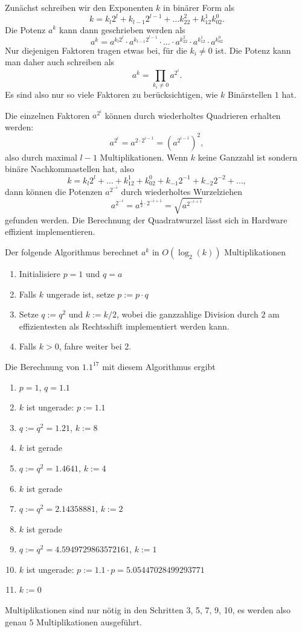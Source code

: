 Zunächst schreiben wir den Exponenten $k$ in binärer Form als
\[
k = k_l2^l + k_{l-1}2^{l-1} + \dots k_22^2+k_12^1 k_02^0.
\]
Die Potenz $a^k$ kann dann geschrieben werden als
\[
a^k
=
a^{k_l2^l} \cdot a^{k_{l-1}2^{l-1}} \cdot \dots \cdot
a^{k_22^2} \cdot a^{k_12^1} \cdot a^{k_02^0}
\]
Nur diejenigen Faktoren tragen etwas bei, für die $k_i\ne 0$ ist.
Die Potenz kann man daher auch schreiben als
\[
a^k
=
\prod_{k_i\ne 0} a^{2^i}.
\]
Es sind also nur so viele Faktoren zu berücksichtigen, wie $k$ 
Binärstellen $1$ hat.

Die einzelnen Faktoren $a^{2^i}$ können durch wiederholtes Quadrieren
erhalten werden:
\[
a^{2^i} = a^{2\cdot 2^{i-1}} = (a^{2^{i-1}})^2,
\]
also durch maximal $l-1$ Multiplikationen.
Wenn $k$ keine Ganzzahl ist sondern binäre Nachkommastellen hat, also
\[
k=k_l2^l + \dots + k_12^1 + k_02^0 + k_{-1}2^{-1} + k_{-2}2^{-2}+\dots,
\]
dann können die Potenzen $a^{2^{-i}}$ durch wiederholtes Wurzelziehen
\[
a^{2^{-i}} = a^{\frac12\cdot 2^{-i+1}} = \sqrt{a^{2^{-i+1}}}
\]
gefunden werden.
Die Berechnung der Quadratwurzel lässt sich in Hardware effizient
implementieren.

\begin{algorithmus}
\label{buch:crypto:teile-und-hersche}
Der folgende Algorithmus berechnet $a^k$ in $O(\log_2(k))$
Multiplikationen
\begin{enumerate}
\item Initialisiere $p=1$ und $q=a$
\item Falls $k$ ungerade ist, setze $p:=p\cdot q$ 
\item Setze $q:=q^2$ und $k := k/2$, wobei die ganzzahlige Division durch $2$
am effizientesten als Rechtsshift implementiert werden kann.
\item Falls $k>0$, fahre weiter bei 2.
\end{enumerate}
\end{algorithmus}

\begin{beispiel}
Die Berechnung von $1.1^{17}$ mit diesem Algorithmus ergibt
\begin{enumerate}
\item $p=1$, $q=1.1$
\item $k$ ist ungerade: $p:=1.1$
\item $q:=q^2=1.21$, $k := 8$
\item $k$ ist gerade
\item $q:=q^2=1.4641$, $k := 4$
\item $k$ ist gerade
\item $q:=q^2=2.14358881$, $k := 2$
\item $k$ ist gerade
\item $q:=q^2=4.5949729863572161$, $k := 1$
\item $k$ ist ungerade: $p:=1.1\cdot p = 5.05447028499293771$
\item $k:=0$
\end{enumerate}
Multiplikationen sind nur nötig in den Schritten 3, 5, 7, 9, 10, es
werden also genau $5$ Multiplikationen ausgeführt.
\end{beispiel}

